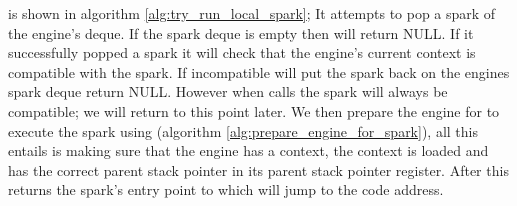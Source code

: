 \tryrunlocalspark is shown in algorithm \ref{alg:try_run_local_spark};
It attempts to pop a spark of the engine's deque.
If the spark deque is empty then \tryrunlocalspark
will return NULL.
If it successfully popped a spark it will
check that the engine's current context is compatible with the spark.
If incompatible \tryrunlocalspark will put the spark back on the engines
spark deque return NULL.
However when \idle calls \tryrunlocalspark the spark will always be
compatible;
we will return to this point later.
We then prepare the engine for to execute the spark using
\prepareengineforspark
(algorithm \ref{alg:prepare_engine_for_spark}),
all this entails is making sure that the engine has a context, the context
is loaded and has the correct parent stack pointer in its parent stack
pointer register.
After this \tryrunlocalspark returns the spark's entry point to \idle which
will jump to the code address.

